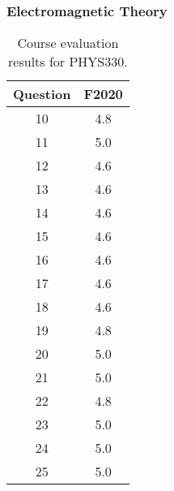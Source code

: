 \documentclass[../../main.tex]{subfiles}
\begin{document}
\subsubsection{Electromagnetic Theory}

\begin{table}
\footnotesize
\centering
\begin{tabular}{| c | c |}
\hline
\hline
Question & F2020 \\ \hline
10 & 4.8 \\ \hline
11 & 5.0 \\ \hline
12 & 4.6 \\ \hline
13 & 4.6 \\ \hline
14 & 4.6 \\ \hline
15 & 4.6 \\ \hline
16 & 4.6 \\ \hline
17 & 4.6 \\ \hline
18 & 4.6 \\ \hline
19 & 4.8 \\ \hline
20 & 5.0 \\ \hline
21 & 5.0 \\ \hline
22 & 4.8 \\ \hline
23 & 5.0 \\ \hline
24 & 5.0 \\ \hline
25 & 5.0 \\ \hline
\hline
\end{tabular}
\caption{\label{tab:eval_330} Course evaluation results for PHYS330.}
\end{table}
\end{document}

